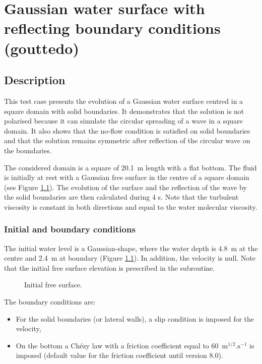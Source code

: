 \chapter{Gaussian water surface with reflecting boundary conditions (gouttedo)}
\label{gouttedo}

\section{Description}
\bigskip
This test case presents the evolution of a Gaussian water surface centred in 
a square domain with solid boundaries. 
It demonstrates that the  solution is not polarised
because it can simulate the circular spreading of a wave in a square
domain.
It also shows that the no-flow condition is satisfied on solid
boundaries and that the solution remains symmetric after reflection
of the circular wave on the boundaries.

\bigskip
The considered domain is a square of 20.1~m length with a flat bottom. 
The fluid is initially at rest with a Gaussian free surface in the 
centre of a square domain (see Figure \ref{t3d:gouttedo:fig:initial}).
The evolution of the surface and the reflection of the wave by the 
solid boundaries are then calculated during 4 s.
Note that the turbulent viscosity is constant in both directions 
and equal to the water molecular viscosity.

\subsection{Initial and boundary conditions}
\bigskip
The initial water level is a Gaussian-shape, where the water 
depth is 4.8~m at the centre and 2.4~m at boundary 
(Figure \ref{t3d:gouttedo:fig:initial}). In addition, the velocity is null.
Note that the initial free surface elevation is prescribed in 
the  subroutine.

\begin{figure}[!htbp]
\centering
\caption{Initial free surface.}
 \label{t3d:gouttedo:fig:initial}
\end{figure}

\bigskip
The boundary conditions are:
\begin{itemize}
\item For the solid boundaries (or lateral walls), a slip condition is
imposed for the velocity,
\item On the bottom a Chézy law with a friction coefficient equal to 
60~$\text{m}^{1/2}.\text{s}^{-1}$ is imposed (default value
for the friction coefficient until version 8.0).
\end{itemize}

